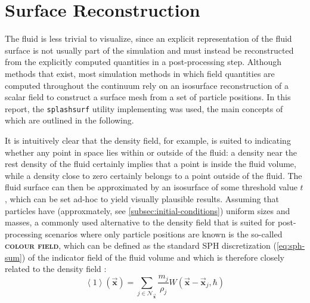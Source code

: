 \documentclass[oneside, a4paper]{book}
\newcommand\emphasis[1]{{\scshape\bfseries#1}}
\newcommand\angled[1]{\left\langle#1\right\rangle}
\newcommand\vek[1]{\vec{\bm{#1}}}
\newcommand\br[1]{\left(#1\right)}
\begin{document}
  \section{Surface Reconstruction}
  The fluid is less trivial to visualize, since an explicit representation of the fluid surface is not usually part of the simulation and must instead be reconstructed from the explicitly computed quantities in a post-processing step. Although methods that \autocite[explicitly operate on a surface representation]{surface-only-fluids} exist, most simulation methods in which field quantities are computed throughout the continuum rely on an isosurface reconstruction of a scalar field to construct a surface mesh from a set of particle positions. In this report, the \texttt{splashsurf} utility implementing \autocite[Weighted Laplacian Smoothing for Surface Recontruction]{laplacian-surf-reconst} was used, the main concepts of which are outlined in the following.
  
  It is intuitively clear that the density field, for example, is suited to indicating whether any point in space lies within or outside of the fluid: a density near the rest density of the fluid certainly implies that a point is inside the fluid volume, while a density close to zero certainly belongs to a point outside of the fluid. The fluid surface can then be approximated by an isosurface of some threshold value $t$, which can be set ad-hoc to yield visually plausible results. Assuming that particles have (approxmately, see \autoref{subsec:initial-conditions}) uniform sizes and masses, a commonly used alternative to the density field that is suited for post-processing scenarios where only particle positions are known is the so-called \emphasis{colour field}, which can be defined as the standard SPH discretization (\autoref{eq:sph-sum}) of the indicator field of the fluid volume and which is therefore closely related to the density field \autocite{laplacian-surf-reconst}:
  \begin{equation}\label{eq:colour-field-def}
    \angled{1}\br{\vek{x}} = \sum_{j\in\mathcal{N}_{\vek{x}}} \frac{m_j}{\rho_j} W(\vek{x}-\vek{x}_j, \hbar)
  \end{equation}
  
\end{document}
